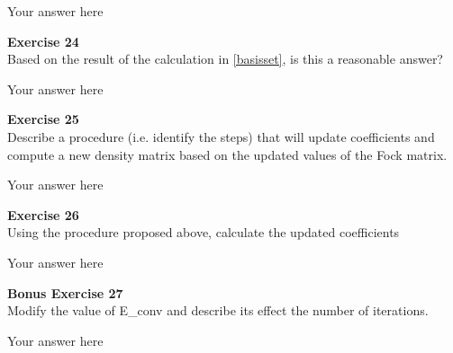 \documentclass{article}
\begin{document}
Your answer here

\begin{mdframed}
\textbf{Exercise 24}\\
Based on the result of the calculation in \ref{basisset}, is this a reasonable answer?
\end{mdframed}

Your answer here

\begin{mdframed}
\textbf{Exercise 25}\\
Describe a procedure (i.e. identify the steps) that will update coefficients and compute a new density matrix based on the updated values of the Fock matrix.
\end{mdframed}

Your answer here

\begin{mdframed}
\textbf{Exercise 26}\\
Using the procedure proposed above, calculate the updated coefficients
\end{mdframed}

Your answer here

\begin{mdframed}
\textbf{Bonus Exercise 27}\\
Modify the value of E\_conv and describe its effect the number of iterations.
\end{mdframed}

Your answer here
\end{document}
